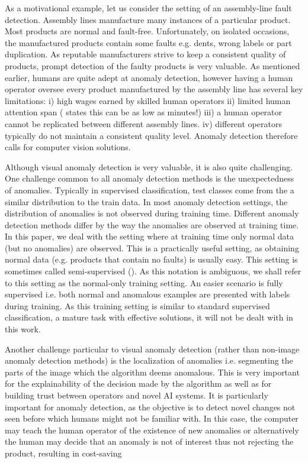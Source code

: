 \documentclass[runningheads]{llncs}
\begin{document}
As a motivational example, let us consider the setting of an assembly-line fault detection. Assembly lines manufacture many instances of a particular product. Most products are normal and fault-free. Unfortunately, on isolated occasions, the manufactured products contain some faults e.g. dents, wrong labels or part duplication. As reputable manufacturers strive to keep a consistent quality of products, prompt detection of the faulty products is very valuable. As mentioned earlier, humans are quite adept at anomaly detection, however having a human operator oversee every product manufactured by the assembly line has several key limitations: i) high wages earned by skilled human operators ii) limited human attention span (\cite{green1999appropriate} states this can be as low as  minutes!) iii) a human operator cannot be replicated between different assembly lines. iv) different operators typically do not maintain a consistent quality level. Anomaly detection therefore calls for computer vision solutions.

Although visual anomaly detection is very valuable, it is also quite challenging. One challenge common to all anomaly detection methods is the unexpectedness of anomalies. Typically in supervised classification, test classes come from the a similar distribution to the train data. In most anomaly detection settings, the distribution of anomalies is not observed during training time. Different anomaly detection methods differ by the way the anomalies are observed at training time. In this paper, we deal with the setting where at training time only normal data (but no anomalies) are observed. This is a practically useful setting, as obtaining normal data (e.g. products that contain no faults) is usually easy. This setting is sometimes called semi-supervised (\cite{chandola2009anomaly}). As this notation is ambiguous, we shall refer to this setting as the normal-only training setting. An easier scenario is fully supervised i.e. both normal and anomalous examples are presented with labels during training. As this training setting is  similar to standard supervised classification, a mature task with effective solutions, it will not be dealt with in this work.  

Another challenge particular to visual anomaly detection (rather than non-image anomaly detection methods) is the localization of anomalies i.e. segmenting the parts of the image which the algorithm deems anomalous. This is very important for the explainability of the decision made by the algorithm as well as for building trust between operators and novel AI systems. It is particularly important for anomaly detection, as the objective is to detect novel changes not seen before which humans might not be familiar with. In this case, the computer may teach the human operator of the existence of new anomalies or alternatively the human may decide that an anomaly is not of interest thus not rejecting the product, resulting in cost-saving
\end{document}
